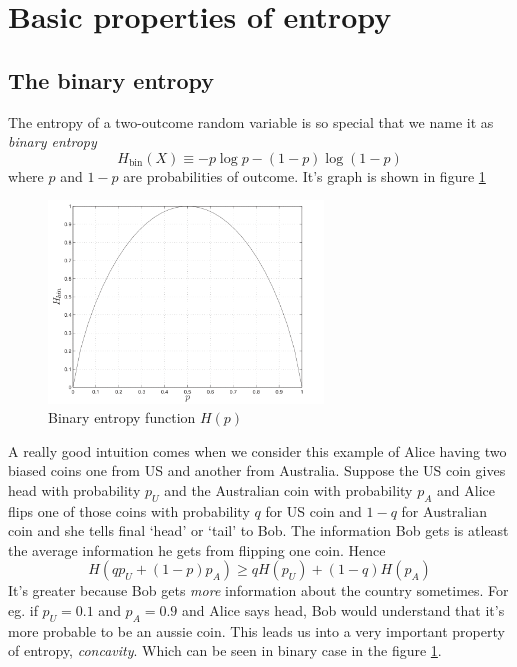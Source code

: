 \section{Basic properties of entropy}
\subsection{The binary entropy}
The entropy of a two-outcome random variable is so special that we name it as \textit{binary entropy}
\begin{equation}
    H_{\text{bin}}(X) \equiv -p\log p - (1-p)\log (1-p)
\end{equation}
where $p$ and $1-p$ are probabilities of outcome. It's graph is shown in figure  \ref{fig:binary-entropy} 
\begin{figure}
    \centering
    \includegraphics[width=0.65\textwidth]{images/binary_entropy.png}
    \caption{Binary entropy function $H(p)$}
    \label{fig:binary-entropy}
\end{figure}

A really good intuition comes when we consider this example of Alice having two biased coins one from US and another from Australia. Suppose the US coin gives head with probability $p_U$ and the Australian coin with probability $p_A$ and Alice flips one of those coins with probability $q$ for US coin and $1-q$ for Australian coin and she tells final `head' or `tail' to Bob. The information Bob gets is atleast the average information he gets from flipping one coin. Hence
\begin{equation}
    H(qp_U + (1-p)p_A) \geq qH(p_U) + (1-q)H(p_A)
\end{equation}
It's greater because Bob gets \textit{more} information about the country sometimes. For eg. if $p_U=0.1$ and $p_A=0.9$ and Alice says head, Bob would understand that it's more probable to be an aussie coin. This leads us into a very important property of entropy, \textit{concavity}. Which can be seen in binary case in the figure \ref{fig:binary-entropy}.

